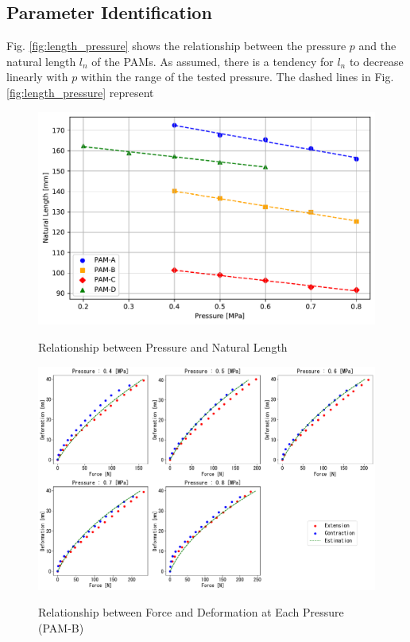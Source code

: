 \subsection{Parameter Identification}
Fig. \ref{fig:length_pressure} shows the relationship between the pressure $p$ and the natural length $l_n$ of the PAMs. As assumed, there is a tendency for $l_n$ to decrease linearly with $p$ within the range of the tested pressure. The dashed lines in Fig. \ref{fig:length_pressure} represent

\begin{figure}[H]
    \hfill
    \begin{minipage}{\columnwidth}
        \centering
        \includegraphics[width=\columnwidth]{fig/length_pressure.pdf} 
        \caption{Relationship between Pressure and Natural Length}
        \label{fig:length_pressure}
        \vspace{1em} 
        \includegraphics[width=\columnwidth]{fig/20231124_5_4s_2d_ieeesensors1.pdf}
        \caption{Relationship between Force and Deformation at Each Pressure (PAM-B)}
        \label{fig:pam_b_static1}
    \end{minipage}
    \hspace{0.05\textwidth} 
\end{figure}

